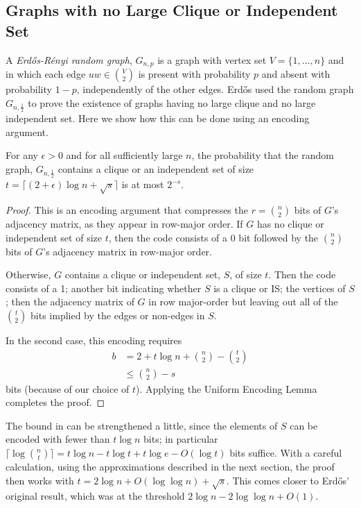 \documentclass[lotsofwhite]{patmorin}
\begin{document}
\subsection{Graphs with no Large Clique or Independent Set}


A \emph{Erd\H{o}s-R\'enyi random graph}, $G_{n,p}$ is a graph with vertex
set $V=\{1,\ldots,n\}$ and in which each edge $uw\in \binom{V}{2}$
is present with probability $p$ and absent with probability $1-p$,
independently of the other edges.  Erd\H{o}s \cite{X} used the random
graph $G_{n,\frac{1}{2}}$ to prove the existence of graphs having no
large clique and no large independent set. Here we show how this can be
done using an encoding argument.

\begin{thm}
  For any $\epsilon>0$ and for all sufficiently large $n$, the probability
  that the random graph, $G_{n,\frac{1}{2}}$ contains a clique or an
  independent set of size $t = \lceil(2+\epsilon)\log n + \sqrt{s}\rceil$
  is at most $2^{-s}$.
\end{thm}

\begin{proof}
  This is an encoding argument that compresses the $r=\binom{n}{2}$ bits
  of $G$'s adjacency matrix, as they appear in row-major order.  If $G$
  has no clique or independent set of size $t$, then the code consists of
  a 0 bit followed by the $\binom{n}{2}$ bits of $G$'s adjacency matrix
  in row-major order.
  
  Otherwise, $G$ contains a clique or independent set, $S$, of size $t$.
  Then the code consists of a 1; another bit indicating whether $S$ is a
  clique or IS; the vertices of $S$; then the adjacency matrix of $G$ in
  row major-order but leaving out all of the $\binom{t}{2}$ bits implied
  by the edges or non-edges in $S$.
  
  In the second case, this encoding requires 
  \begin{align*}
     b & = 2 + t\log n + \binom{n}{2}-\binom{t}{2} \\
       & \le \binom{n}{2} - s 
  \end{align*}
  bits (because of our choice of $t$).   Applying the Uniform Encoding
  Lemma completes the proof.
\end{proof}

\begin{rem}
The bound in  can be strengthened a little, since
the elements of $S$ can be encoded with fewer than $t\log n$ bits; in
particular $\lceil\log\binom{n}{t}\rceil=t\log n - t\log t + t\log e -
O(\log t)$ bits suffice.  With a careful calculation, using the approximations
described in the next section, the proof then
works with $t=2\log n +O(\log\log n) + \sqrt{s}$. This comes closer to
Erdős' original result, which was at the threshold $2\log n - 2\log\log
n + O(1)$.
\end{rem}
\end{document}
